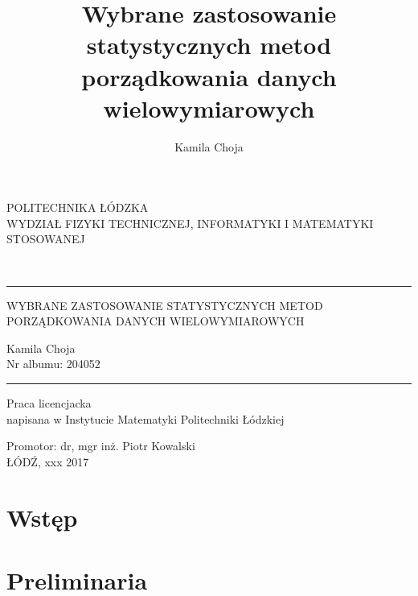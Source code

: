 \documentclass[12pt,a4paper]{report}
\author{Kamila Choja}
\title{Wybrane zastosowanie statystycznych metod porządkowania danych wielowymiarowych}
\begin{document}
\begin{titlepage}

\begin{center}
        \vspace*{1cm}
        {\large POLITECHNIKA ŁÓDZKA}\\
       \vspace*{1cm}
        {\large WYDZIAŁ FIZYKI TECHNICZNEJ, INFORMATYKI I MATEMATYKI STOSOWANEJ}\\
        \vspace*{2cm}
    \end{center}        
        
\\
\vspace*{0.3cm}
\hspace*{0.3cm}
  
\begin{center}
\rule{\textwidth}{0.5pt}

\vspace*{0.5cm}
   
{\large WYBRANE ZASTOSOWANIE STATYSTYCZNYCH METOD\\ }
{\large PORZĄDKOWANIA DANYCH WIELOWYMIAROWYCH\\}
\vspace*{1cm}


\begin{flushright}
Kamila Choja\\
Nr albumu: 204052 
 \end{flushright}
\rule{\textwidth}{0.5pt}

Praca licencjacka\\
napisana w Instytucie Matematyki Politechniki Łódzkiej\\

\vspace*{2cm}

Promotor: dr, mgr inż. Piotr Kowalski\\
\vfill
ŁÓDŹ, xxx 2017


     \end{center}   
\end{titlepage}

\tableofcontents

\chapter{Wstęp}


\chapter{Preliminaria}  
\end{document}
